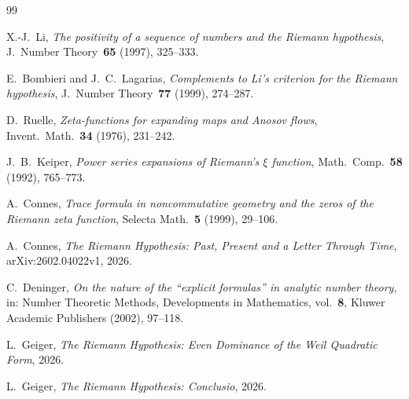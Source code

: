 \documentclass[12pt,a4paper]{article}
\theoremstyle{definition}
\theoremstyle{remark}
\begin{document}
\begin{thebibliography}{99}

X.-J.~Li, \emph{The positivity of a sequence of numbers and the Riemann hypothesis}, J.~Number Theory~\textbf{65} (1997), 325--333.

E.~Bombieri and J.~C.~Lagarias, \emph{Complements to Li's criterion for the Riemann hypothesis}, J.~Number Theory~\textbf{77} (1999), 274--287.

D.~Ruelle, \emph{Zeta-functions for expanding maps and Anosov flows}, Invent.~Math.~\textbf{34} (1976), 231--242.

J.~B.~Keiper, \emph{Power series expansions of Riemann's $\xi$ function}, Math.~Comp.~\textbf{58} (1992), 765--773.

A.~Connes, \emph{Trace formula in noncommutative geometry and the zeros of the Riemann zeta function}, Selecta Math.~\textbf{5} (1999), 29--106.

A.~Connes, \emph{The Riemann Hypothesis: Past, Present and a Letter Through Time}, arXiv:2602.04022v1, 2026.

C.~Deninger, \emph{On the nature of the ``explicit formulas'' in analytic number theory}, in: Number Theoretic Methods, Developments in Mathematics, vol.~\textbf{8}, Kluwer Academic Publishers (2002), 97--118.

L.~Geiger, \emph{The Riemann Hypothesis: Even Dominance of the Weil Quadratic Form}, 2026.

L.~Geiger, \emph{The Riemann Hypothesis: Conclusio}, 2026.

\end{thebibliography}
\end{document}
